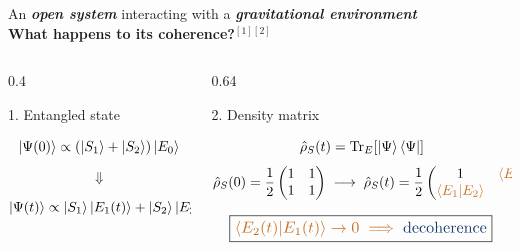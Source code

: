 \documentclass[aspectratio=169]{beamer}
\begin{document}
\begin{frame}[c]
\centering

{\small An \textit{\bfseries\color{graviton}open system} interacting with a
\textit{\bfseries\color{matter}gravitational environment}}\\[0.08cm]
\vspace{0.cm}
{\Large\bfseries\color{graviton!80} What happens to its coherence?$^{[1][2]}$}\\[0.25cm]

\begin{columns}[T,totalwidth=1.05\textwidth]

\begin{column}{0.4\textwidth}
\begin{block}{1. Entangled state}
\small

\[
\ket{\Psi(0)} \propto (\ket{S_1}+\ket{S_2})\ket{E_0}
\]

\vspace{-0.7cm}
\[
\Downarrow
\]
\vspace{-1.6cm}

\[
\ket{\Psi(t)} \propto
\ket{S_1}\ket{E_1(t)} +
\ket{S_2}\ket{E_2(t)}
\]

\end{block}
\vspace{3cm}
\end{column}

\begin{column}{0.64\textwidth}
\begin{block}{2. Density matrix}
\small

\[
\hat{\rho}_S(t)=\mathrm{Tr}_E\!\left[\ket{\Psi}\bra{\Psi}\right]\]
\[
\hat{\rho}_S(0)=\frac12
\begin{pmatrix}
1 & 1\\
1 & 1
\end{pmatrix}
\;\longrightarrow\;
\hat{\rho}_S(t)=\frac12
\begin{pmatrix}
1 & \color{matter}{\langle E_2|E_1\rangle}\\
\color{matter}{\langle E_1|E_2\rangle} & 1
\end{pmatrix}
\]

\vspace{-0cm}
\[
\scalebox{1.15}{\boxed{
\color{matter}{\langle E_2(t)|E_1(t)\rangle} \to 0
\;\Longrightarrow\;
\color{graviton}{\text{decoherence}}
}}
\]
\vspace{0.6cm}
\begin{tikzpicture}[
x=0.9cm,
y=0.85cm,
scale=0.95,
every node/.style={font=\scriptsize},
>=stealth
]


\end{tikzpicture}
\end{block}
\end{column}
\end{columns}
\end{frame}
\end{document}
